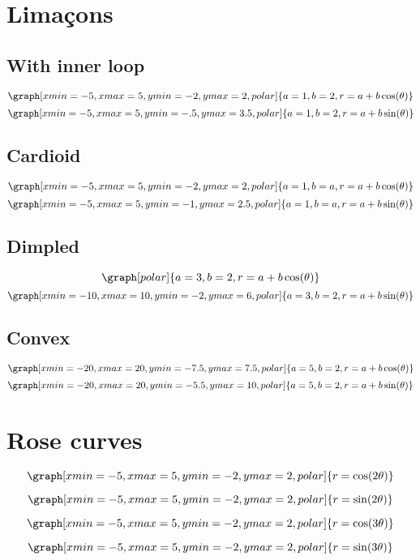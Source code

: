 \documentclass{ximera}
\begin{document}
\section{Lima\c{c}ons}

\subsection{With inner loop}
\[
\graph[xmin=-5,xmax=5,ymin=-2,ymax=2,polar]{a=1,b=2,r=a+b \cos(\theta)}
\]
\[
\graph[xmin=-5,xmax=5,ymin=-.5,ymax=3.5,polar]{a=1,b=2,r=a+b \sin(\theta)}
\]
\subsection{Cardioid}
\[
\graph[xmin=-5,xmax=5,ymin=-2,ymax=2,polar]{a=1,b=a,r=a+b \cos(\theta)}
\]
\[
\graph[xmin=-5,xmax=5,ymin=-1,ymax=2.5,polar]{a=1,b=a,r=a+b \sin(\theta)}
\]
\subsection{Dimpled}
\[
\graph[polar]{a=3,b=2,r=a+b \cos(\theta)}
\]
\[
\graph[xmin=-10,xmax=10,ymin=-2,ymax=6,polar]{a=3,b=2,r=a+b \sin(\theta)}
\]

\subsection{Convex}
\[
\graph[xmin=-20,xmax=20,ymin=-7.5,ymax=7.5,polar]{a=5,b=2,r=a+b \cos(\theta)}
\]
\[
\graph[xmin=-20,xmax=20,ymin=-5.5,ymax=10,polar]{a=5,b=2,r=a+b \sin(\theta)}
\]

\section{Rose curves}

\[
\graph[xmin=-5,xmax=5,ymin=-2,ymax=2,polar]{r=\cos(2\theta)}
\]

\[
\graph[xmin=-5,xmax=5,ymin=-2,ymax=2,polar]{r=\sin(2\theta)}
\]

\[
\graph[xmin=-5,xmax=5,ymin=-2,ymax=2,polar]{r=\cos(3\theta)}
\]

\[
\graph[xmin=-5,xmax=5,ymin=-2,ymax=2,polar]{r=\sin(3\theta)}
\]
\end{document}
